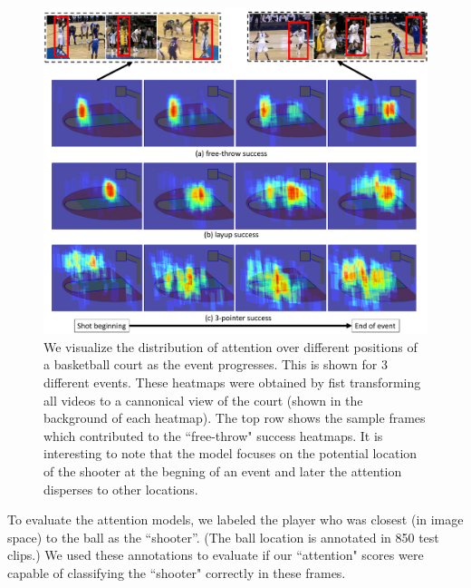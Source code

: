 \begin{figure}[t!]
\begin{center}
  \vspace{-4mm}
  \includegraphics[width=0.9\linewidth]{images/heatmap_figure_v2_cropped.pdf}
\end{center}
  \vspace{-4mm}
   \caption{We visualize the distribution of attention over different positions of
   a basketball court as the event progresses. This is shown for 3 different events.
   These heatmaps were obtained by fist transforming all videos
 to a cannonical view of the court (shown in the background of each heatmap). The top row shows
 the sample frames which contributed to the ``free-throw" success heatmaps. It is interesting
 to note that the model focuses on the potential location of the shooter at the begning of an
 event and later the attention disperses to other locations.}
  \vspace{-4mm}
\label{fig:att_heatmap}
\end{figure}

To evaluate the attention models, we  labeled the player who was
closest (in image space) to the ball as the ``shooter''.
(The ball location is annotated in 850 test clips.)
We used these annotations to evaluate if our ``attention" scores
were capable of classifying the ``shooter" correctly in these frames.

